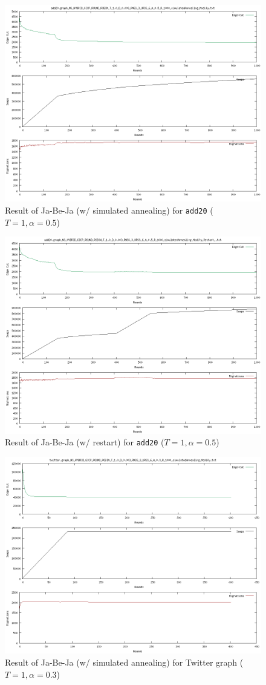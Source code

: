 \documentclass[]{article}
\begin{document}
\begin{figure}[!h]
    \centering
    \includegraphics[width=.5\textwidth]{../task2/add20.graph_NS_HYBRID_GICP_ROUND_ROBIN_T_1.0_D_0.003_RNSS_3_URSS_6_A_0.5_R_1000_simulatedAnnealing_Modify.txt.png}
    \caption{Result of Ja-Be-Ja (w/ simulated annealing) for \texttt{add20} ($T=1, \alpha=0.5$)}
\end{figure}


\begin{figure}[!h]
    \centering
    \includegraphics[width=.5\textwidth]{../task2/add20.graph_NS_HYBRID_GICP_ROUND_ROBIN_T_1.0_D_0.003_RNSS_3_URSS_6_A_0.5_R_1000_simulatedAnnealing_Modify_Restart_.txt.png}
    \caption{Result of Ja-Be-Ja (w/ restart) for \texttt{add20} ($T=1, \alpha=0.5$)}
\end{figure}

\pagebreak

\begin{figure}[!h]
    \centering
    \includegraphics[width=.5\textwidth]{../task2/twitter.graph_NS_HYBRID_GICP_ROUND_ROBIN_T_1.0_D_0.003_RNSS_3_URSS_6_A_0.3_R_1000_simulatedAnnealing_Modify.txt.png}
    \caption{Result of Ja-Be-Ja (w/ simulated annealing) for Twitter graph ($T=1, \alpha=0.3$)}
\end{figure}
\end{document}
